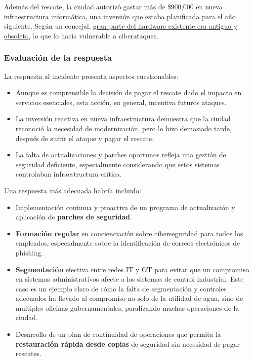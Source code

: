 Además del rescate, la ciudad autorizó gastar más de \$900,000 en nueva infraestructura informática, una inversión que estaba planificada para el año siguiente. Según un concejal, \ul{gran parte del hardware existente era antiguo y obsoleto}, lo que lo hacía vulnerable a ciberataques.

\subsubsection{Evaluación de la respuesta}
La respuesta al incidente presenta aspectos cuestionables:

\begin{itemize}
    \item Aunque es comprensible la decisión de pagar el rescate dado el impacto en servicios esenciales, esta acción, en general, incentiva futuros ataques.
    
    \item La inversión reactiva en nueva infraestructura demuestra que la ciudad reconoció la necesidad de modernización, pero lo hizo demasiado tarde, después de sufrir el ataque y pagar el rescate.
    
    \item La falta de actualizaciones y parches oportunos refleja una gestión de seguridad deficiente, especialmente considerando que estos sistemas controlaban infraestructura crítica.
\end{itemize}

Una respuesta más adecuada habría incluido:

\begin{itemize}
    \item Implementación continua y proactiva de un programa de actualización y aplicación de \textbf{parches de seguridad}.
    
    \item \textbf{Formación regular} en concienciación sobre ciberseguridad para todos los empleados, especialmente sobre la identificación de correos electrónicos de phishing.
    
    \item \textbf{Segmentación} efectiva entre redes \textsc{IT} y \textsc{OT} para evitar que un compromiso en sistemas administrativos afecte a los sistemas de control industrial.
    Este caso es un ejemplo claro de cómo la falta de segmentación y controles adecuados ha llevado al compromiso no solo de la utilidad de agua, sino de multiples oficinas gubernamentales, paralizando muchas operaciones de la ciudad.
    
    \item Desarrollo de un plan de continuidad de operaciones que permita la\textbf{ restauración rápida desde copias} de seguridad sin necesidad de pagar rescates.
\end{itemize}


